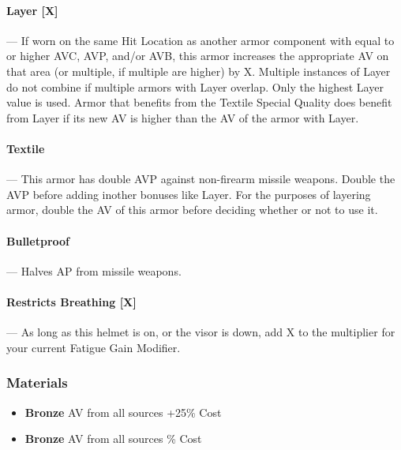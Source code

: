 \documentclass[oneside,11pt,english]{book}
\begin{document}
\vspace*{-10pt}\paragraph[Layer]{\label{par:Layer}Layer [X]}---\quad
	If worn on the same Hit Location as another armor component with equal to or higher AVC, AVP, and/or AVB, this armor increases the appropriate AV on that area (or multiple, if multiple are higher) by X. Multiple instances of Layer do not combine if multiple armors with Layer overlap. Only the highest Layer value is used. Armor that benefits from the Textile Special Quality does benefit from Layer if its new AV is higher than the AV of the armor with Layer.
\vspace*{-10pt}\paragraph{\label{par:Textile}Textile}---\quad
	This armor has double AVP against non-firearm missile weapons. Double the AVP before adding inother bonuses like Layer. For the purposes of layering armor, double the AV of this armor before deciding whether or not to use it.
\vspace*{-10pt}\paragraph{\label{par:Bulletproof}Bulletproof}---\quad
	Halves AP from missile weapons.
\vspace*{-10pt}\paragraph[Restricts Breathing]{\label{par:Restricts Breathing}Restricts Breathing [X]}---\quad
	As long as this helmet is on, or the visor is down, add X to the multiplier for your current Fatigue Gain Modifier.

\subsubsection{Materials}
\begin{itemize}
	\item [] \textbf{Bronze}
	 AV from all sources
	\subitem +25\% Cost
\end{itemize}

\begin{itemize}
	\item [] \textbf{Bronze}
	 AV from all sources
	\% Cost
\end{itemize}
\end{document}
